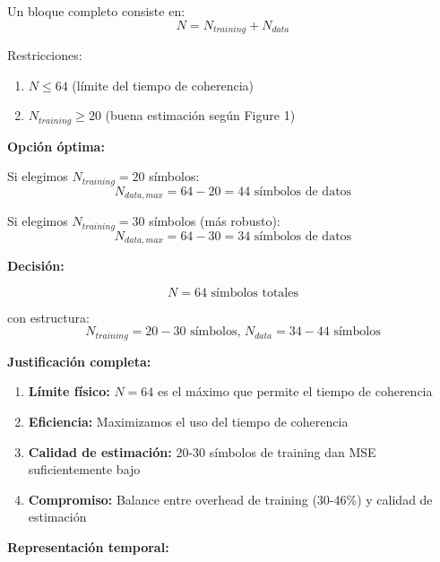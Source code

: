 \documentclass[11pt,a4paper]{article}
\begin{document}
Un bloque completo consiste en:
\[
N = N_{training} + N_{data}
\]

Restricciones:
\begin{enumerate}
    \item $N \leq 64$ (l\'imite del tiempo de coherencia)
    \item $N_{training} \geq 20$ (buena estimaci\'on seg\'un Figure 1)
\end{enumerate}

\textbf{Opci\'on \'optima:}

Si elegimos $N_{training} = 20$ s\'imbolos:
\[
N_{data,max} = 64 - 20 = 44 \text{ s\'imbolos de datos}
\]

Si elegimos $N_{training} = 30$ s\'imbolos (m\'as robusto):
\[
N_{data,max} = 64 - 30 = 34 \text{ s\'imbolos de datos}
\]

\textbf{Decisi\'on:}

\[
\boxed{N = 64 \text{ s\'imbolos totales}}
\]

con estructura:
\[
\boxed{N_{training} = 20-30 \text{ s\'imbolos, } N_{data} = 34-44 \text{ s\'imbolos}}
\]

\textbf{Justificaci\'on completa:}

\begin{enumerate}
    \item \textbf{L\'imite f\'isico:} $N = 64$ es el m\'aximo que permite el tiempo de coherencia
    
    \item \textbf{Eficiencia:} Maximizamos el uso del tiempo de coherencia
    
    \item \textbf{Calidad de estimaci\'on:} 20-30 s\'imbolos de training dan MSE suficientemente bajo
    
    \item \textbf{Compromiso:} Balance entre overhead de training (30-46\%) y calidad de estimaci\'on
\end{enumerate}

\textbf{Representaci\'on temporal:}

\begin{center}
\end{center}
\end{document}
